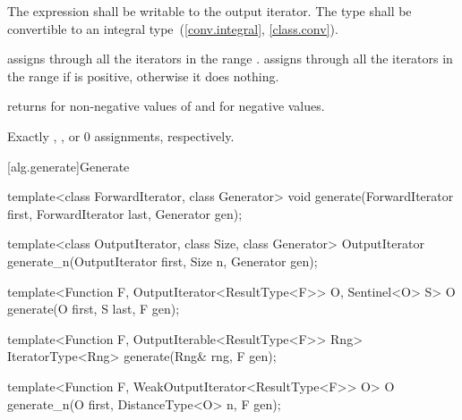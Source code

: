 \begin{itemdescr}
\begin{removedblock}
\pnum
\requires
The expression
shall be writable to the output iterator. The type
shall be convertible to an integral type~(\ref{conv.integral}, \ref{class.conv}).
\end{removedblock}

\pnum
\effects
{} assigns  through all the
iterators in the range . 
assigns  through all the iterators in the range 
if  is positive, otherwise it does nothing.

\pnum
\returns {} returns 
for non-negative values of  and  for negative values.

\pnum
\complexity
Exactly
,
, or 0 assignments, respectively.
\end{itemdescr}

[alg.generate]{Generate}

%
%
\begin{removedblock}
\begin{itemdecl}
template<class ForwardIterator, class Generator>
  void generate(ForwardIterator first, ForwardIterator last,
                Generator gen);

template<class OutputIterator, class Size, class Generator>
  OutputIterator generate_n(OutputIterator first, Size n, Generator gen);
\end{itemdecl}
\end{removedblock}
\begin{addedblock}
\begin{itemdecl}
template<Function F, OutputIterator<ResultType<F>> O,
    Sentinel<O> S>
  O generate(O first, S last, F gen);

template<Function F, OutputIterable<ResultType<F>> Rng>
  IteratorType<Rng>
    generate(Rng& rng, F gen);

template<Function F, WeakOutputIterator<ResultType<F>> O>
  O generate_n(O first, DistanceType<O> n, F gen);
\end{itemdecl}
\end{addedblock}

